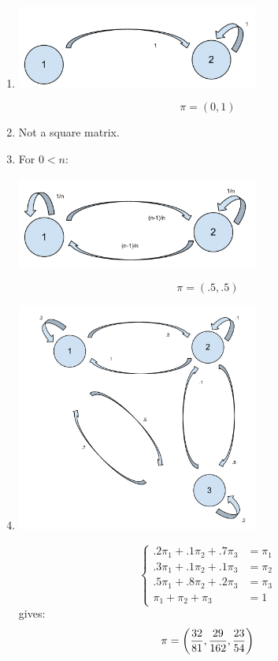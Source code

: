 \documentclass[12pt]{article}
\begin{document}
\begin{enumerate}
\begin{enumerate}
\item
\begin{center}
\includegraphics[width=8cm]{Markov_Chains_Ex_2-a.pdf}
\end{center}
$$\pi=(0,1)$$

\item Not a square matrix.
\item
For $0<n$:
\begin{center}
\includegraphics[width=8cm]{Markov_Chains_Ex_2-c.pdf}
\end{center}
$$\pi=(.5,.5)$$
\item
\begin{center}
\includegraphics[width=8cm]{Markov_Chains_Ex_2-d.pdf}
\end{center}
$$\begin{cases}
.2\pi_1+.1\pi_2+.7\pi_3&=\pi_1\\
.3\pi_1+.1\pi_2+.1\pi_3&=\pi_2\\
.5\pi_1+.8\pi_2+.2\pi_3&=\pi_3\\
\pi_1+\pi_2+\pi_3&=1
\end{cases}$$
gives:
$$\pi=\left({32\over 81},{29\over 162},{23\over 54}\right)$$


\end{enumerate}
\end{enumerate}
\end{document}
